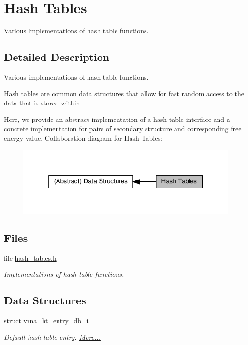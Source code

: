 \hypertarget{group__hash__table__utils}{}\section{Hash Tables}
\label{group__hash__table__utils}


Various implementations of hash table functions.  




\subsection{Detailed Description}
Various implementations of hash table functions. 

Hash tables are common data structures that allow for fast random access to the data that is stored within.

Here, we provide an abstract implementation of a hash table interface and a concrete implementation for pairs of secondary structure and corresponding free energy value. Collaboration diagram for Hash Tables\+:
\nopagebreak
\begin{figure}[H]
\begin{center}
\leavevmode
\includegraphics[width=319pt]{group__hash__table__utils}
\end{center}
\end{figure}
\subsection*{Files}
\begin{DoxyCompactItemize}
\item 
file \hyperlink{hash__tables_8h}{hash\+\_\+tables.\+h}
\begin{DoxyCompactList}\small\item\em Implementations of hash table functions. \end{DoxyCompactList}\end{DoxyCompactItemize}
\subsection*{Data Structures}
\begin{DoxyCompactItemize}
\item 
struct \hyperlink{group__hash__table__utils_structvrna__ht__entry__db__t}{vrna\+\_\+ht\+\_\+entry\+\_\+db\+\_\+t}
\begin{DoxyCompactList}\small\item\em Default hash table entry.  \hyperlink{group__hash__table__utils_structvrna__ht__entry__db__t}{More...}\end{DoxyCompactList}\end{DoxyCompactItemize}
